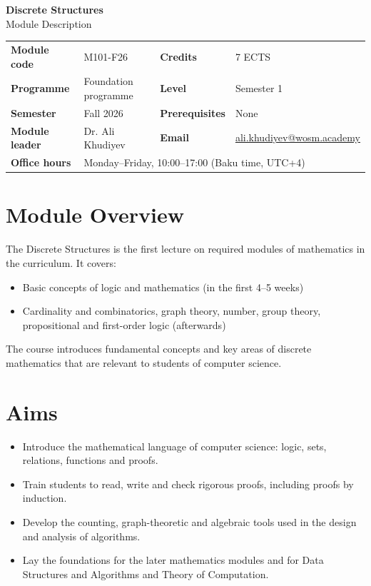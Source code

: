 \documentclass[11pt,a4paper]{article}
\makeatletter
\newcommand{\ModuleTitle}{Discrete Structures}
\newcommand{\ModuleCode}{M101-F26}
\newcommand{\Programme}{Foundation programme}
\newcommand{\Level}{Semester 1}
\newcommand{\Semester}{Fall 2026}
\newcommand{\Credits}{7 ECTS}
\newcommand{\ModuleLeader}{Dr. Ali Khudiyev}
\newcommand{\Email}{ali.khudiyev@wosm.academy}
\newcommand{\OfficeHours}{Monday--Friday, 10:00--17:00 (Baku time, UTC+4)}
\newcommand{\Prerequisites}{None}
\makeatother
\begin{document}
\begin{center}
  {\LARGE\bfseries\color{accent} \ModuleTitle}\\[4pt]
  {\large Module Description}
\end{center}
\vspace{6pt}

\begin{tabularx}{\textwidth}{>{\bfseries}l X >{\bfseries}l X}
\toprule
Module code   & \ModuleCode    & Credits      & \Credits \\
Programme     & \Programme     & Level        & \Level \\
Semester      & \Semester      & Prerequisites & \Prerequisites \\
Module leader & \ModuleLeader  & Email        & \href{mailto:\Email}{\Email} \\
Office hours  & \multicolumn{3}{l}{\OfficeHours} \\
\bottomrule
\end{tabularx}

\section{Module Overview}
The Discrete Structures is the first lecture on required modules of mathematics in
the curriculum. It covers:
\begin{itemize}
  \item Basic concepts of logic and mathematics (in the first 4--5 weeks)
  \item Cardinality and combinatorics, graph theory, number, group theory,
        propositional and first-order logic (afterwards)
\end{itemize}

The course introduces fundamental concepts and key areas of discrete mathematics
that are relevant to students of computer science.

\section{Aims}
\begin{itemize}
  \item Introduce the mathematical language of computer science: logic, sets,
        relations, functions and proofs.
  \item Train students to read, write and check rigorous proofs, including proofs
        by induction.
  \item Develop the counting, graph-theoretic and algebraic tools used in the design
        and analysis of algorithms.
  \item Lay the foundations for the later mathematics modules and for Data
        Structures and Algorithms and Theory of Computation.
\end{itemize}
\end{document}

